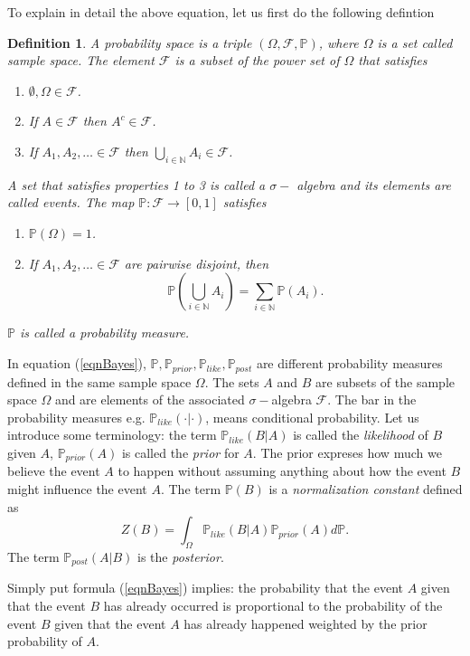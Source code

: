 \documentclass[12pt]{book}
\newtheorem{definition}{Definition}
\newcommand{\post}{\mathbb{P}_{post}}
\newcommand{\like}{\mathbb{P}_{like}}
\newcommand{\prior}{\mathbb{P}_{prior}}
\newcommand{\p}{\mathbb{P}}
\begin{document}
To explain in detail the above equation, let us first do the following defintion
\cite{dudley2002real}
\begin{definition}\label{dfn:probabilitytriple}
A probability space is a triple $(\Omega,\mathscr{F},\p)$, where $\Omega$ is a set called 
sample space.
The element $\mathscr{F}$ is a subset of the power set of $\Omega$ that satisfies
\begin{enumerate}
\item $\emptyset,\Omega\in\mathscr{F}$.
\item If $A\in\mathscr{F}$ then $A^{c}\in\mathscr{F}$.
\item If $A_{1},A_{2},\ldots \in\mathscr{F}$ then $\bigcup_{i\in\mathbb{N}}A_{i}\in\mathscr{F}$.
\end{enumerate}
A set that satisfies properties 1 to 3 is called a $\sigma-$ algebra and its elements are called
events. The map $\p:\mathscr{F}\rightarrow [0,1]$ satisfies
\begin{enumerate}
\item $\p(\Omega)=1$.
\item If $A_{1},A_{2},\ldots \in\mathscr{F}$ are pairwise disjoint, then 
\begin{equation*}
\p(\bigcup_{i\in\mathbb{N}}A_{i})=\sum_{i\in\mathbb{N}}\p(A_{i}).
\end{equation*}
\end{enumerate}
$\p$ is called a probability measure.
\end{definition}


In equation (\ref{eqnBayes}), $\p,\prior,\like,\post$ are different probability measures defined in the
same sample space $\Omega$. The sets $A$ and $B$ are subsets of the sample space $\Omega$ and 
are elements of the associated $\sigma-$algebra $\mathscr{F}$. The bar in the probability
measures e.g. $\like(\cdot|\cdot)$, means conditional probability. Let us introduce some terminology:
 the term $\like(B|A)$ is called the \textit{likelihood} of $B$ given $A$, $\prior(A)$ is called the 
\textit{prior} for $A$. The prior expreses how much we believe the event $A$ to happen without assuming
anything about how the event $B$ might influence the event $A$. 
The term $\p(B)$ is a \textit{normalization constant} defined as 
\begin{equation*}
Z(B)=\int_{\Omega} \like(B|A)\prior(A)d\p.
\end{equation*}
The term $\post(A|B)$ is  the \textit{posterior}.

Simply put  formula (\ref{eqnBayes}) implies: the probability that the event $A$ given that
the event $B$ has already occurred is proportional to the probability of the event $B$ given
that the event $A$ has already happened weighted by the prior probability of $A$.
\newline
\end{document}
